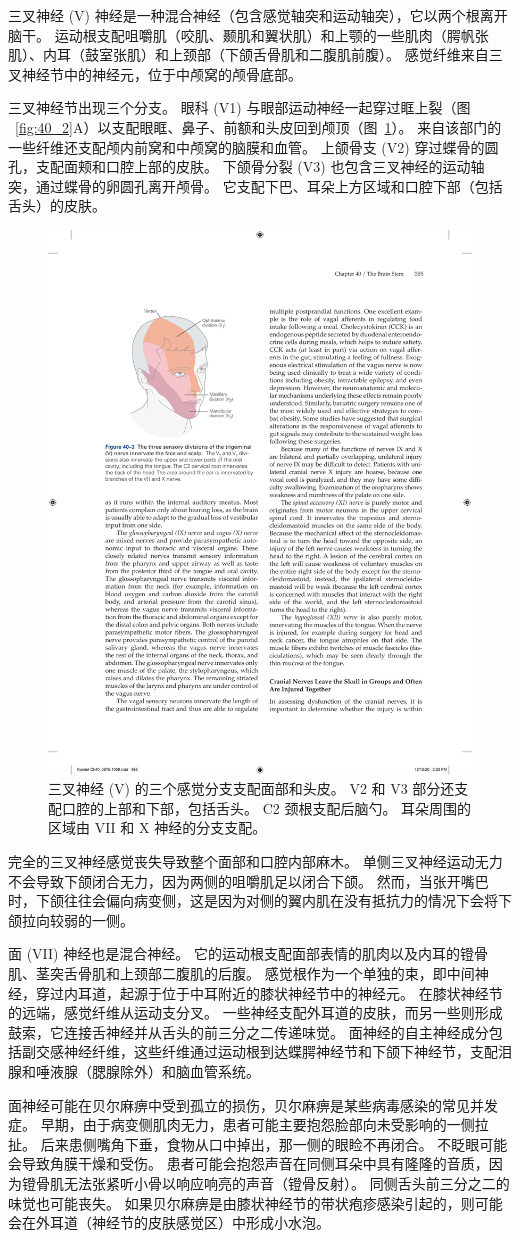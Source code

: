 三叉神经 (V) 神经是一种混合神经（包含感觉轴突和运动轴突），它以两个根离开脑干。
运动根支配咀嚼肌（咬肌、颞肌和翼状肌）和上颚的一些肌肉（腭帆张肌）、内耳（鼓室张肌）和上颈部（下颌舌骨肌和二腹肌前腹）。
感觉纤维来自三叉神经节中的神经元，位于中颅窝的颅骨底部。


三叉神经节出现三个分支。
眼科 (V1) 与眼部运动神经一起穿过眶上裂（图 ~\ref{fig:40_2}A）以支配眼眶、鼻子、前额和头皮回到颅顶（图~\ref{fig:40_3}）。
来自该部门的一些纤维还支配颅内前窝和中颅窝的脑膜和血管。
上颌骨支 (V2) 穿过蝶骨的圆孔，支配面颊和口腔上部的皮肤。
下颌骨分裂 (V3) 也包含三叉神经的运动轴突，通过蝶骨的卵圆孔离开颅骨。
它支配下巴、耳朵上方区域和口腔下部（包括舌头）的皮肤。


\begin{figure}[htbp]
	\centering
	\includegraphics[width=0.4\linewidth]{chap40/fig_40_3}
	\caption{三叉神经 (V) 的三个感觉分支支配面部和头皮。 V2 和 V3 部分还支配口腔的上部和下部，包括舌头。 C2 颈根支配后脑勺。 耳朵周围的区域由 VII 和 X 神经的分支支配。}
	\label{fig:40_3}
\end{figure}


完全的三叉神经感觉丧失导致整个面部和口腔内部麻木。
单侧三叉神经运动无力不会导致下颌闭合无力，因为两侧的咀嚼肌足以闭合下颌。
然而，当张开嘴巴时，下颌往往会偏向病变侧，这是因为对侧的翼内肌在没有抵抗力的情况下会将下颌拉向较弱的一侧。


面 (VII) 神经也是混合神经。
它的运动根支配面部表情的肌肉以及内耳的镫骨肌、茎突舌骨肌和上颈部二腹肌的后腹。
感觉根作为一个单独的束，即中间神经，穿过内耳道，起源于位于中耳附近的膝状神经节中的神经元。
在膝状神经节的远端，感觉纤维从运动支分叉。
一些神经支配外耳道的皮肤，而另一些则形成鼓索，它连接舌神经并从舌头的前三分之二传递味觉。
面神经的自主神经成分包括副交感神经纤维，这些纤维通过运动根到达蝶腭神经节和下颌下神经节，支配泪腺和唾液腺（腮腺除外）和脑血管系统。


面神经可能在贝尔麻痹中受到孤立的损伤，贝尔麻痹是某些病毒感染的常见并发症。
早期，由于病变侧肌肉无力，患者可能主要抱怨脸部向未受影响的一侧拉扯。
后来患侧嘴角下垂，食物从口中掉出，那一侧的眼睑不再闭合。
不眨眼可能会导致角膜干燥和受伤。 患者可能会抱怨声音在同侧耳朵中具有隆隆的音质，因为镫骨肌无法张紧听小骨以响应响亮的声音（镫骨反射）。
同侧舌头前三分之二的味觉也可能丧失。
如果贝尔麻痹是由膝状神经节的带状疱疹感染引起的，则可能会在外耳道（神经节的皮肤感觉区）中形成小水泡。


